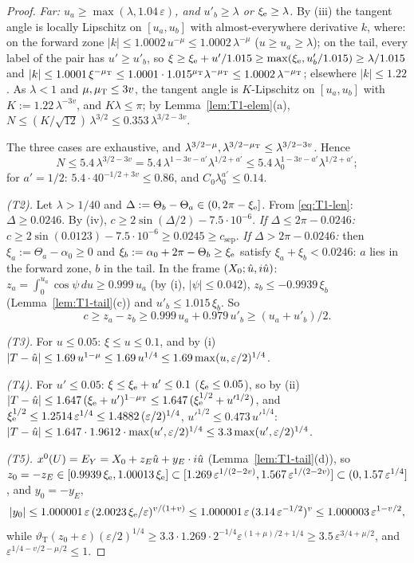 \begin{proof}
\emph{Far: $u_a\ge\max(\lambda,1.04\,\varepsilon)$, and $u'_b\ge\lambda$ or $\xi_{\mathrm e}\ge\lambda$.} By (iii) the tangent angle is locally
Lipschitz on $[u_a,u_b]$ with almost-everywhere derivative $k$, where: on the forward zone $|k|\le1.0002\,u^{-\mu}\le1.0002\,\lambda^{-\mu}$
($u\ge u_a\ge\lambda$); on the tail, every label of the pair has $u'\ge u'_b$, so $\xi\ge\xi_{\mathrm e}+u'/1.015\ge\max(\xi_{\mathrm e},u'_b/1.015)\ge\lambda/1.015$
and $|k|\le1.0001\,\xi^{-\mu_{\mathrm T}}\le1.0001\cdot1.015^{\mu_{\mathrm T}}\lambda^{-\mu_{\mathrm T}}\le1.0002\,\lambda^{-\mu_{\mathrm T}}$; elsewhere $|k|\le1.22$. As $\lambda<1$ and
$\mu,\mu_{\mathrm T}\le3v$, the tangent angle is $K$-Lipschitz on $[u_a,u_b]$ with $K:=1.22\,\lambda^{-3v}$, and $K\lambda\le\pi$; by
Lemma~\ref{lem:T1-elem}(a), $N\le(K/\sqrt{12})\,\lambda^{3/2}\le0.353\,\lambda^{3/2-3v}$.

The three cases are exhaustive, and $\lambda^{3/2-\mu},\lambda^{3/2-\mu_{\mathrm T}}\le\lambda^{3/2-3v}$. Hence
\[
N\le5.4\,\lambda^{3/2-3v}=5.4\,\lambda^{1-3v-a'}\lambda^{1/2+a'}\le5.4\,\lambda_0^{1-3v-a'}\lambda^{1/2+a'};
\]
for $a'=1/2$: $5.4\cdot40^{-1/2+3v}\le0.86$, and $C_0\lambda_0^{a'}\le0.14$.

\emph{\textup{(T2)}.} Let $\lambda>1/40$ and $\Delta:=\Theta_b-\Theta_a\in(0,2\pi-\xi_{\mathrm e}]$. From \eqref{eq:T1-len}: $\Delta\ge0.0246$. By
(iv), $c\ge2\sin(\Delta/2)-7.5\cdot10^{-6}$. \emph{If $\Delta\le2\pi-0.0246$:} $c\ge2\sin(0.0123)-7.5\cdot10^{-6}\ge0.0245\ge
c_{\mathrm{sep}}$. \emph{If $\Delta>2\pi-0.0246$:} then $\xi_a:=\Theta_a-\alpha_0\ge0$ and $\xi_b:=\alpha_0+2\pi-\Theta_b\ge\xi_{\mathrm e}$ satisfy
$\xi_a+\xi_b<0.0246$: $a$ lies in the forward zone, $b$ in the tail. In the frame $(X_0;\hat u,i\hat u)$:
$z_a=\int_0^{u_a}\cos\psi\,du\ge0.999\,u_a$ (by (i), $|\psi|\le0.042$), $z_b\le-0.9939\,\xi_b$ (Lemma~\ref{lem:T1-tail}(c)) and
$u'_b\le1.015\,\xi_b$. So
\[
c\ge z_a-z_b\ge0.999\,u_a+0.979\,u'_b\ge(u_a+u'_b)/2 .
\]

\emph{\textup{(T3)}.} For $u\le0.05$: $\xi\le u\le0.1$, and by (i)
$|T-\hat u|\le1.69\,u^{1-\mu}\le1.69\,u^{1/4}\le1.69\max(u,\varepsilon/2)^{1/4}$.

\emph{\textup{(T4)}.} For $u'\le0.05$: $\xi\le\xi_{\mathrm e}+u'\le0.1$ ($\xi_{\mathrm e}\le0.05$), so by (ii)
$|T-\hat u|\le1.647\,(\xi_{\mathrm e}+u')^{1-\mu_{\mathrm T}}\le1.647\,(\xi_{\mathrm e}^{1/2}+u'^{1/2})$, and $\xi_{\mathrm e}^{1/2}\le1.2514\,\varepsilon^{1/4}\le1.4882\,(\varepsilon/2)^{1/4}$,
$u'^{1/2}\le0.473\,u'^{1/4}$: $|T-\hat u|\le1.647\cdot1.9612\cdot\max(u',\varepsilon/2)^{1/4}\le3.3\max(u',\varepsilon/2)^{1/4}$.

\emph{\textup{(T5)}.} $x^0(U)=E_Y=X_0+z_E\hat u+y_E\cdot i\hat u$ (Lemma~\ref{lem:T1-tail}(d)), so
$z_0=-z_E\in[0.9939\,\xi_{\mathrm e},1.00013\,\xi_{\mathrm e}]\subset[1.269\,\varepsilon^{1/(2-2v)},1.567\,\varepsilon^{1/(2-2v)}]\subset(0,1.57\,\varepsilon^{1/4}]$,
and $y_0=-y_E$,
\[
|y_0|\le1.000001\,\varepsilon\,(2.0023\,\xi_{\mathrm e}/\varepsilon)^{v/(1+v)}\le1.000001\,\varepsilon\,(3.14\,\varepsilon^{-1/2})^v\le1.000003\,\varepsilon^{1-v/2},
\]
while $\vartheta_{\mathrm T}(z_0+\varepsilon)(\varepsilon/2)^{1/4}\ge3.3\cdot1.269\cdot2^{-1/4}\varepsilon^{(1+\mu)/2+1/4}\ge3.5\,\varepsilon^{3/4+\mu/2}$,
and $\varepsilon^{1/4-v/2-\mu/2}\le1$.
\end{proof}


